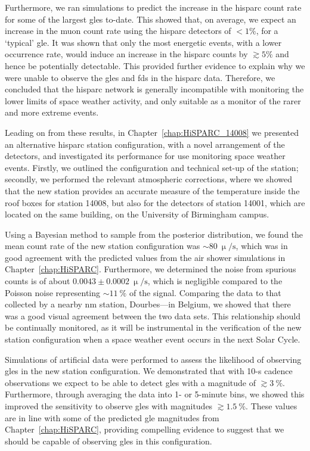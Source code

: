 Furthermore, we ran simulations to predict the increase in the \gls{hisparc} count rate for some of the largest \glspl{gle} to-date. This showed that, on average, we expect an increase in the muon count rate using the \gls{hisparc} detectors of $<1\%$, for a `typical' \gls{gle}. It was shown that only the most energetic events, with a lower occurrence rate, would induce an increase in the \gls{hisparc} counts by $\gtrsim5\%$ and hence be potentially detectable. This provided further evidence to explain why we were unable to observe the \glspl{gle} and \glspl{fd} in the \gls{hisparc} data. Therefore, we concluded that the \gls{hisparc} network is generally incompatible with monitoring the lower limits of space weather activity, and only suitable as a monitor of the rarer and more extreme events.


Leading on from these results, in Chapter~\ref{chap:HiSPARC_14008} we presented an alternative \gls{hisparc} station configuration, with a novel arrangement of the detectors, and investigated its performance for use monitoring space weather events. Firstly, we outlined the configuration and technical set-up of the station; secondly, we performed the relevant atmospheric corrections, where we showed that the new station provides an accurate measure of the temperature inside the roof boxes for station 14008, but also for the detectors of station 14001, which are located on the same building, on the University of Birmingham campus.

Using a Bayesian method to sample from the posterior distribution, we found the mean count rate of the new station configuration was $\sim80~\upmu/\mathrm{s}$, which was in good agreement with the predicted values from the air shower simulations in Chapter~\ref{chap:HiSPARC}. Furthermore, we determined the noise from spurious counts is of about $0.0043\pm0.0002~\upmu/\mathrm{s}$, which is negligible compared to the Poisson noise representing $\sim11~\%$ of the signal. Comparing the data to that collected by a nearby \gls{nm} station, Dourbes---in Belgium, we showed that there was a good visual agreement between the two data sets. This relationship should be continually monitored, as it will be instrumental in the verification of the new station configuration when a space weather event occurs in the next Solar Cycle.

Simulations of artificial data were performed to assess the likelihood of observing \glspl{gle} in the new station configuration. We demonstrated that with 10-s cadence observations we expect to be able to detect \glspl{gle} with a magnitude of $\gtrsim3~\%$. Furthermore, through averaging the data into 1- or 5-minute bins, we showed this improved the sensitivity to observe \glspl{gle} with magnitudes $\gtrsim1.5~\%$. These values are in line with some of the predicted \gls{gle} magnitudes from Chapter~\ref{chap:HiSPARC}, providing compelling evidence to suggest that we should be capable of observing \glspl{gle} in this configuration.

